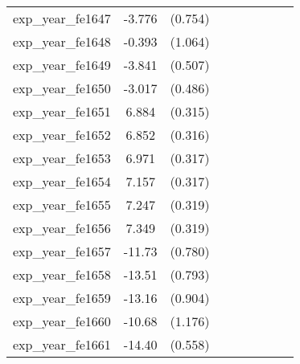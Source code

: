 {\begin{tabular}{l*{4}{cc}}
exp\_year\_fe1647&   -3.776\sym{***}&  (0.754)&                  &         &                  &         &                  &         \\
exp\_year\_fe1648&   -0.393         &  (1.064)&                  &         &                  &         &                  &         \\
exp\_year\_fe1649&   -3.841\sym{***}&  (0.507)&                  &         &                  &         &                  &         \\
exp\_year\_fe1650&   -3.017\sym{***}&  (0.486)&                  &         &                  &         &                  &         \\
exp\_year\_fe1651&    6.884\sym{***}&  (0.315)&                  &         &                  &         &                  &         \\
exp\_year\_fe1652&    6.852\sym{***}&  (0.316)&                  &         &                  &         &                  &         \\
exp\_year\_fe1653&    6.971\sym{***}&  (0.317)&                  &         &                  &         &                  &         \\
exp\_year\_fe1654&    7.157\sym{***}&  (0.317)&                  &         &                  &         &                  &         \\
exp\_year\_fe1655&    7.247\sym{***}&  (0.319)&                  &         &                  &         &                  &         \\
exp\_year\_fe1656&    7.349\sym{***}&  (0.319)&                  &         &                  &         &                  &         \\
exp\_year\_fe1657&   -11.73\sym{***}&  (0.780)&                  &         &                  &         &                  &         \\
exp\_year\_fe1658&   -13.51\sym{***}&  (0.793)&                  &         &                  &         &                  &         \\
exp\_year\_fe1659&   -13.16\sym{***}&  (0.904)&                  &         &                  &         &                  &         \\
exp\_year\_fe1660&   -10.68\sym{***}&  (1.176)&                  &         &                  &         &                  &         \\
exp\_year\_fe1661&   -14.40\sym{***}&  (0.558)&                  &         &                  &         &                  &         \\

\end{tabular}}
